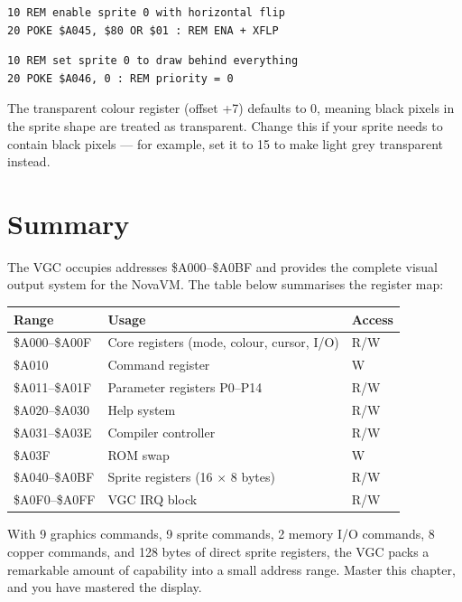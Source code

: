 \begin{lstlisting}
10 REM enable sprite 0 with horizontal flip
20 POKE $A045, $80 OR $01 : REM ENA + XFLP
\end{lstlisting}

\begin{lstlisting}
10 REM set sprite 0 to draw behind everything
20 POKE $A046, 0 : REM priority = 0
\end{lstlisting}

\begin{notebox}
The transparent colour register (offset +7) defaults to 0, meaning black
pixels in the sprite shape are treated as transparent.  Change this if your
sprite needs to contain black pixels --- for example, set it to 15 to make
light grey transparent instead.
\end{notebox}


\section*{Summary}

The VGC occupies addresses \$A000--\$A0BF and provides the complete visual
output system for the NovaVM.  The table below summarises the register map:

\begin{center}
\small
\begin{tabular}{@{}lll@{}}
\toprule
\textbf{Range} & \textbf{Usage} & \textbf{Access} \\
\midrule
\$A000--\$A00F  & Core registers (mode, colour, cursor, I/O) & R/W \\
\$A010          & Command register                           & W \\
\$A011--\$A01F  & Parameter registers P0--P14                & R/W \\
\$A020--\$A030  & Help system                                & R/W \\
\$A031--\$A03E  & Compiler controller                        & R/W \\
\$A03F          & ROM swap                                   & W \\
\$A040--\$A0BF  & Sprite registers (16 $\times$ 8 bytes)     & R/W \\
\$A0F0--\$A0FF  & VGC IRQ block                              & R/W \\
\bottomrule
\end{tabular}
\end{center}

With 9 graphics commands, 9 sprite commands, 2 memory I/O commands, 8 copper
commands, and 128 bytes of direct sprite registers, the VGC packs a remarkable
amount of capability into a small address range.  Master this chapter, and
you have mastered the display.
